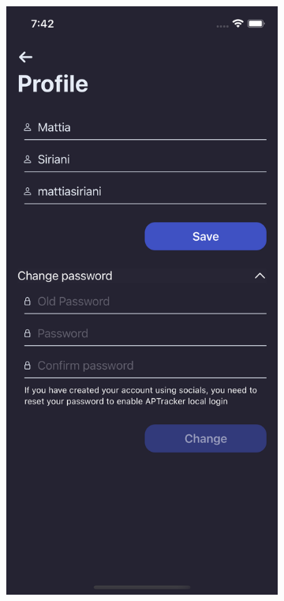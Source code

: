 \begin{figure}[h!]
        \centering
        \begin{subfigure}[b]{0.3\textwidth}
            \centering
            \includegraphics[width=\textwidth]{images/interfaces/user_profile_settings_screen.png}

\end{subfigure}
\end{figure}
